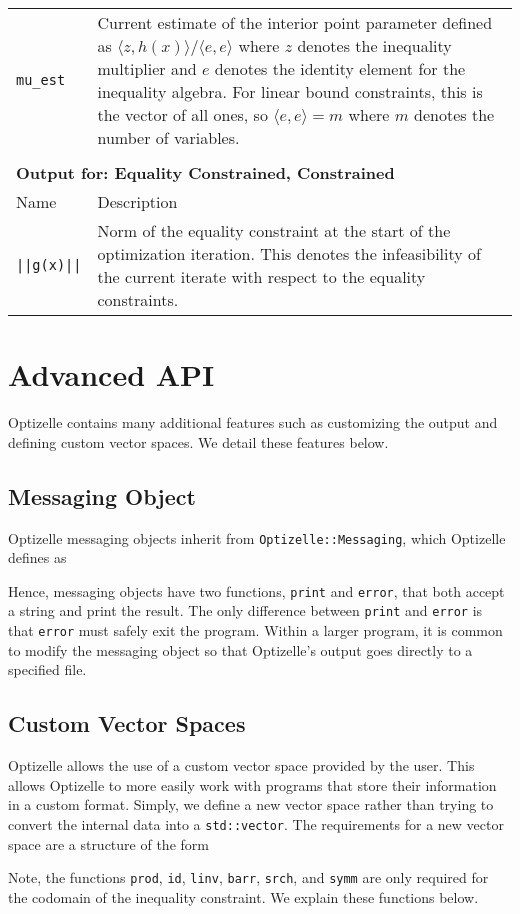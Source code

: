 \documentclass{report}
\begin{document}
\begin{longtable}{lp{}}
\texttt{mu\_est} & Current estimate of the interior point parameter defined as $\langle z,h(x) \rangle/\langle e,e\rangle$ where $z$ denotes the inequality multiplier and $e$ denotes the identity element for the inequality algebra.  For linear bound constraints, this is the vector of all ones, so $\langle e,e\rangle=m$ where $m$ denotes the number of variables.\\
\\
\multicolumn{2}{p{\textwidth}}{\bf Output for: Equality Constrained, Constrained}\\
Name & Description\\
\texttt{||g(x)||} & Norm of the equality constraint at the start of the optimization iteration.  This denotes the infeasibility of the current iterate with respect to the equality constraints. 
\end{longtable}

\chapter{Advanced API}\label{ch:Advanced}

        Optizelle contains many additional features such as customizing the output and defining custom vector spaces.  We detail these features below.

\section{Messaging Object}

        Optizelle messaging objects inherit from \texttt{Optizelle::Messaging}, which Optizelle defines as

Hence, messaging objects have two functions, \texttt{print} and \texttt{error}, that both accept a string and print the result.  The only difference between \texttt{print} and \texttt{error} is that \texttt{error} must safely exit the program.  Within a larger program, it is common to modify the messaging object so that Optizelle's output goes directly to a specified file.

\section{Custom Vector Spaces}

        Optizelle allows the use of a custom vector space provided by the user.  This allows Optizelle to more easily work with programs that store their information in a custom format.  Simply, we define a new vector space rather than trying to convert the internal data into a \texttt{std::vector}.  The requirements for a new vector space are a structure of the form

Note, the functions \texttt{prod}, \texttt{id}, \texttt{linv}, \texttt{barr}, \texttt{srch}, and \texttt{symm} are only required for the codomain of the inequality constraint.  We explain these functions below.
\end{document}

